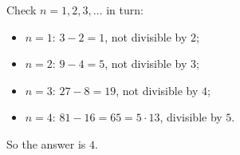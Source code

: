 Check $n=1,2,3,\dots$ in turn:
\begin{itemize}
\item $n=1$: $3-2=1$, not divisible by $2$;
\item $n=2$: $9-4=5$, not divisible by $3$;
\item $n=3$: $27-8=19$, not divisible by $4$;
\item $n=4$: $81-16=65=5\cdot13$, divisible by $5$.
\end{itemize}
So the answer is $\boxed{4}$.
